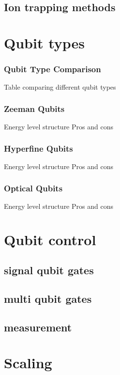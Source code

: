 \documentclass[18 pt]{beamer}
\begin{document}
\subsection{Ion trapping methods}
\section{Qubit types}
\begin{frame}{}
  \frametitle{Qubit Type Comparison}
  Table comparing different qubit types 
\end{frame}
\begin{frame}{}
  \frametitle{Zeeman Qubits}
  Energy level structure
  Pros and cons \end{frame}
  \begin{frame}{}
  \frametitle{Hyperfine Qubits}
  Energy level structure
  Pros and cons
\end{frame}
\begin{frame}{}
  \frametitle{Optical Qubits}
  Energy level structure
  Pros and cons
\end{frame}
\section{Qubit control}
\subsection{signal qubit gates}
\subsection{multi qubit gates}
\subsection{measurement}
\section{Scaling}
\end{document}
